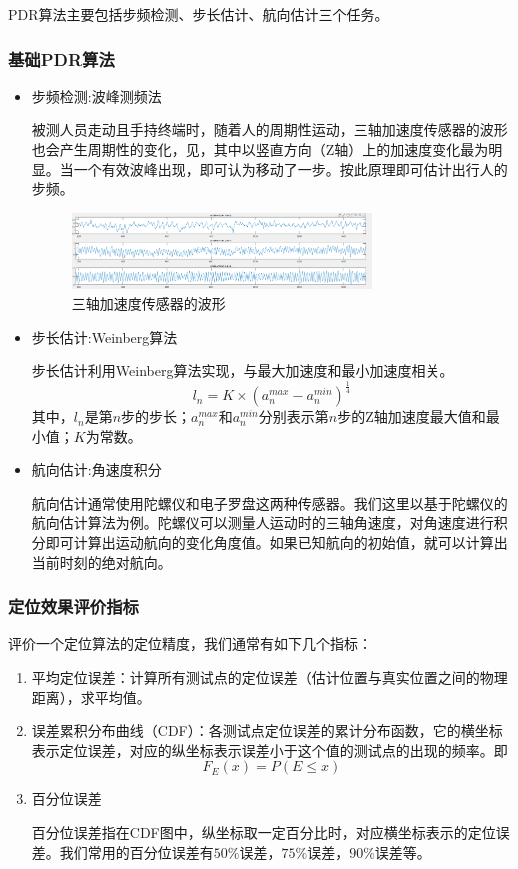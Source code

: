 \documentclass[a4paper]{article}
\begin{document}
PDR算法主要包括步频检测、步长估计、航向估计三个任务。
\subsubsection{基础PDR算法}
\begin{itemize}
    \item 步频检测:波峰测频法 
    
    被测人员走动且手持终端时，随着人的周期性运动，三轴加速度传感器的波形也会产生周期性的变化，见，其中以竖直方向（Z轴）上的加速度变化最为明显。当一个有效波峰出现，即可认为移动了一步。按此原理即可估计出行人的步频。
    \begin{figure}[htbp]
    	\centering
    	\includegraphics[width=0.75\textwidth]{fig/accxyz.png}
    	\caption{三轴加速度传感器的波形}
    	\label{accxyz}
    \end{figure}  
    \item 步长估计:Weinberg算法 
    
    步长估计利用Weinberg算法实现，与最大加速度和最小加速度相关。
    $$ l_n = K \times \left( a_n^{max} - a_n^{min}\right)^{ \frac{1}{4}}$$
    其中，$l_n$是第$n$步的步长；$a_n^{max}$和$a_n^{min}$分别表示第$n$步的Z轴加速度最大值和最小值；$K$为常数。
    \item 航向估计:角速度积分

    航向估计通常使用陀螺仪和电子罗盘这两种传感器。我们这里以基于陀螺仪的航向估计算法为例。陀螺仪可以测量人运动时的三轴角速度，对角速度进行积分即可计算出运动航向的变化角度值。如果已知航向的初始值，就可以计算出当前时刻的绝对航向。
\end{itemize}
\subsubsection{定位效果评价指标}
评价一个定位算法的定位精度，我们通常有如下几个指标：
\begin{enumerate}
    \item 平均定位误差：计算所有测试点的定位误差（估计位置与真实位置之间的物理距离），求平均值。
    \item 误差累积分布曲线（CDF）：各测试点定位误差的累计分布函数，它的横坐标表示定位误差，对应的纵坐标表示误差小于这个值的测试点的出现的频率。即$$F_E(x) = P(E\leq x)$$
    \item 百分位误差

    百分位误差指在CDF图中，纵坐标取一定百分比时，对应横坐标表示的定位误差。我们常用的百分位误差有$50\%$误差，$75\%$误差，$90\%$误差等。
\end{enumerate}
\end{document}
